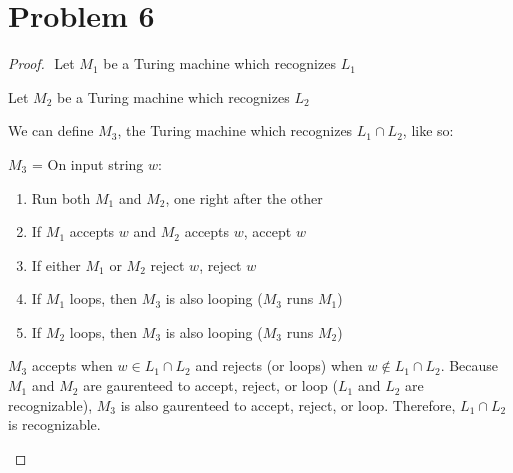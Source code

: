 \documentclass{article}
\newenvironment{problem}[1]{
  \nobreak\section*{Problem #1}
}{}
\begin{document}
  \begin{problem}{6}
    \begin{proof}
      $ $\newline
      Let $M_1$ be a Turing machine which recognizes $L_1$

      \noindent
      Let $M_2$ be a Turing machine which recognizes $L_2$

      \noindent
      We can define $M_3$, the Turing machine which recognizes
      $L_1 \cap L_2$, like so:

      \begin{center}
        $M_3$ = On input string $w$: \begin{enumerate}
          \item Run both $M_1$ and $M_2$, one right after the other
          \item If $M_1$ accepts $w$ and $M_2$ accepts $w$, accept $w$
          \item If either $M_1$ or $M_2$ reject $w$, reject $w$
          \item If $M_1$ loops, then $M_3$ is also looping ($M_3$ runs $M_1$)
          \item If $M_2$ loops, then $M_3$ is also looping ($M_3$ runs $M_2$)
        \end{enumerate}
      \end{center}

      \noindent
      $M_3$ accepts when $w \in L_1 \cap L_2$ and rejects (or loops)
      when $w \notin L_1 \cap L_2$.  Because $M_1$ and $M_2$ are
      gaurenteed to accept, reject, or loop ($L_1$ and $L_2$ are 
      recognizable), $M_3$ is also gaurenteed to accept, reject, or 
      loop.  Therefore, $L_1 \cap L_2$ is recognizable.

      $ $\newline
    \end{proof}
  \end{problem}
\end{document}
